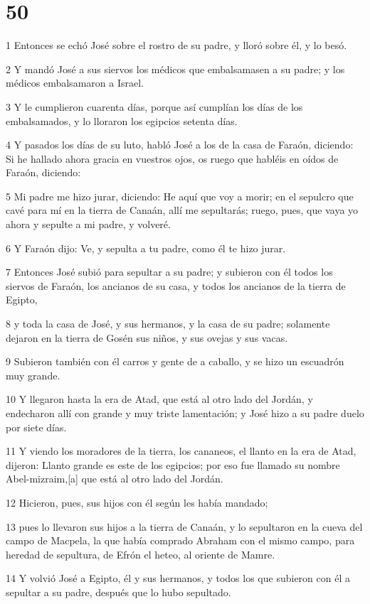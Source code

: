 \chapter{50}

1 Entonces se echó José sobre el rostro de su padre, y lloró sobre él, y lo besó.

2 Y mandó José a sus siervos los médicos que embalsamasen a su padre; y los médicos embalsamaron a Israel.

3 Y le cumplieron cuarenta días, porque así cumplían los días de los embalsamados, y lo lloraron los egipcios setenta días.

4 Y pasados los días de su luto, habló José a los de la casa de Faraón, diciendo: Si he hallado ahora gracia en vuestros ojos, os ruego que habléis en oídos de Faraón, diciendo:

5 Mi padre me hizo jurar, diciendo: He aquí que voy a morir; en el sepulcro que cavé para mí en la tierra de Canaán, allí me sepultarás; ruego, pues, que vaya yo ahora y sepulte a mi padre, y volveré.

6 Y Faraón dijo: Ve, y sepulta a tu padre, como él te hizo jurar.

7 Entonces José subió para sepultar a su padre; y subieron con él todos los siervos de Faraón, los ancianos de su casa, y todos los ancianos de la tierra de Egipto,

8 y toda la casa de José, y sus hermanos, y la casa de su padre; solamente dejaron en la tierra de Gosén sus niños, y sus ovejas y sus vacas.

9 Subieron también con él carros y gente de a caballo, y se hizo un escuadrón muy grande.

10 Y llegaron hasta la era de Atad, que está al otro lado del Jordán, y endecharon allí con grande y muy triste lamentación; y José hizo a su padre duelo por siete días.

11 Y viendo los moradores de la tierra, los cananeos, el llanto en la era de Atad, dijeron: Llanto grande es este de los egipcios; por eso fue llamado su nombre Abel-mizraim,[a] que está al otro lado del Jordán.

12 Hicieron, pues, sus hijos con él según les había mandado;

13 pues lo llevaron sus hijos a la tierra de Canaán, y lo sepultaron en la cueva del campo de Macpela, la que había comprado Abraham con el mismo campo, para heredad de sepultura, de Efrón el heteo, al oriente de Mamre.

14 Y volvió José a Egipto, él y sus hermanos, y todos los que subieron con él a sepultar a su padre, después que lo hubo sepultado.

